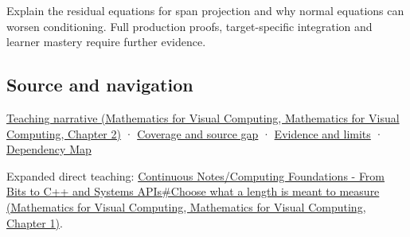 Explain the residual equations for span projection and why normal equations can worsen conditioning. Full production proofs, target-specific integration and learner mastery require further evidence.

\subsection{Source and navigation}\label{appendix-3b863809f82a-source-and-navigation}

\href{../02-Mathematics-for-Visual-Computing/main.pdf\#nameddest=01-foundations-i-ch018-a-gram-matrix-remembers-the-geometry-of-a-slanted-basis}{Teaching narrative (Mathematics for Visual Computing, Mathematics for Visual Computing, Chapter 2)} · \hyperref[appendix-fd090d982a15-phase-6---parts-501-600]{Coverage and source gap} · \hyperref[appendix-a103e7846d21-phase-6---source-analysis-and-verification]{Evidence and limits} · \hyperref[appendix-4ad47bdd269a]{Dependency Map}

Expanded direct teaching: \href{../02-Mathematics-for-Visual-Computing/main.pdf\#nameddest=01-foundations-i-ch017-choose-what-a-length-is-meant-to-measure}{Continuous Notes/Computing Foundations - From Bits to C++ and Systems APIs\#Choose what a length is meant to measure (Mathematics for Visual Computing, Mathematics for Visual Computing, Chapter 1)}.

